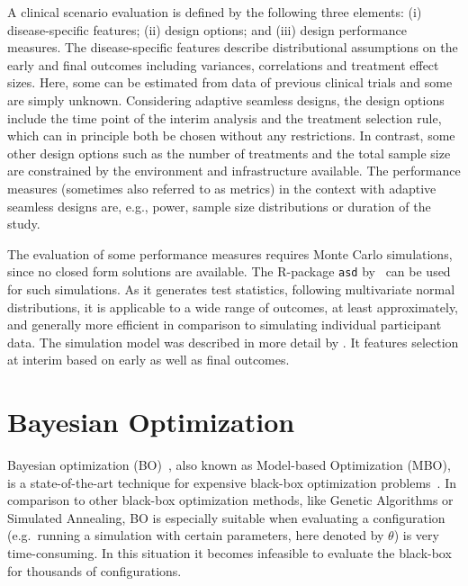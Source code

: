 \documentclass[bimj,fleqn]{w-art}
\theoremstyle{plain}
\theoremstyle{definition}
\begin{document}
A clinical scenario evaluation is defined by the following three elements: (i) disease-specific features; (ii) design options; and (iii) design performance measures.
The disease-specific features describe distributional assumptions on the early and final outcomes including variances, correlations and treatment effect sizes.
Here, some can be estimated from data of previous clinical trials and some are simply unknown. Considering adaptive seamless designs, the design options include the time point of the interim analysis and the treatment selection rule, which can in principle both be chosen without any restrictions.
In contrast, some other design options such as the number of treatments and the total sample size are constrained by the environment and infrastructure available.
The performance measures (sometimes also referred to as metrics) in the context with adaptive seamless designs are, e.g., power, sample size distributions or duration of the study.

The evaluation of some performance measures requires Monte Carlo simulations, since no closed form solutions are available. 
The R-package \texttt{asd} by~\citet{parsons_software_2011} can be used for such simulations.
As it generates test statistics, following multivariate normal distributions, it is applicable to a wide range of outcomes, at least approximately, and generally more efficient in comparison to simulating individual participant data.
The simulation model was described in more detail by \citet{friede_adaptive_2020}. 
It features selection at interim based on early as well as final outcomes.


\section{Bayesian Optimization}
\label{sec:bayesian_optimization}

Bayesian optimization (BO)~\citep{jones_taxonomy_2001}, also known as Model-based Optimization (MBO), is a state-of-the-art technique for expensive black-box optimization problems~\citep{shahriari_taking_2016}.
In comparison to other black-box optimization methods, like Genetic Algorithms or Simulated Annealing, BO is especially suitable when evaluating a configuration (e.g.\ running a simulation with certain parameters, here denoted by $\theta$) is very time-consuming.
In this situation it becomes infeasible to evaluate the black-box for thousands of configurations.
\end{document}

